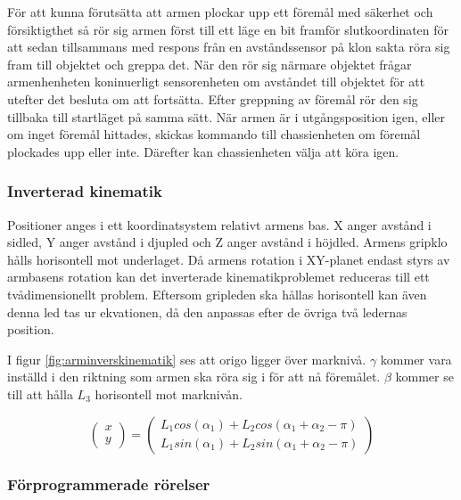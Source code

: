 För att kunna förutsätta att armen plockar upp ett föremål med säkerhet och försiktigthet så rör sig armen först till ett läge en bit framför slutkoordinaten för att sedan tillsammans med respons från en avståndssensor på klon sakta röra sig fram till objektet och greppa det. När den rör sig närmare objektet frågar armenhenheten koninuerligt sensorenheten om avståndet till objektet för att utefter det besluta om att fortsätta. Efter greppning av föremål rör den sig tillbaka till startläget på samma sätt. När armen är i utgångsposition igen, eller om inget föremål hittades, skickas kommando till chassienheten om föremål plockades upp eller inte. Därefter kan chassienheten välja att köra igen.


\subsubsection{Inverterad kinematik}
\label{inverskinematik}

Positioner anges i ett koordinatsystem relativt armens bas. X anger avstånd i sidled, Y anger avstånd i djupled och Z anger avstånd i höjdled. Armens gripklo hålls horisontell mot underlaget. Då armens rotation i XY-planet endast styrs av armbasens rotation kan det inverterade kinematikproblemet reduceras till ett tvådimensionellt problem. Eftersom gripleden ska hållas horisontell kan även denna led tas ur ekvationen, då den anpassas efter de övriga två ledernas position.


I figur \ref{fig:arminverskinematik} ses att origo ligger över marknivå. $\gamma$ kommer vara inställd i den riktning som armen ska röra sig i för att nå föremålet. $\beta$ kommer se till att hålla $L_{3}$ horisontell mot marknivån.

$$
\begin{pmatrix}
	x \\
	y
\end{pmatrix}
 = 
\begin{pmatrix}
	L_{1}cos(\alpha_{1}) + L_{2}cos(\alpha_{1} + \alpha_{2} - \pi) \\
	L_{1}sin(\alpha_{1}) + L_{2}sin(\alpha_{1} + \alpha_{2} - \pi)
\end{pmatrix}$$



\subsubsection{Förprogrammerade rörelser}


